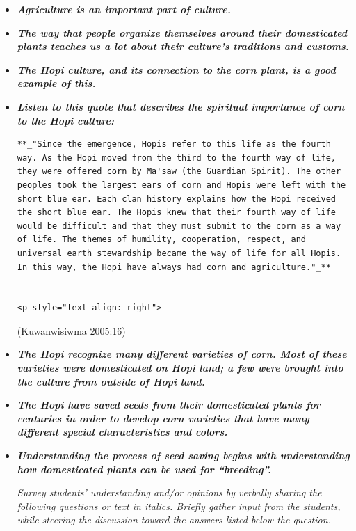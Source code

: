 \documentclass[12pt,]{article}
\begin{document}
\begin{itemize}
\item
  \textbf{\emph{Agriculture is an important part of culture. }}
\item
  \textbf{\emph{The way that people organize themselves around their domesticated plants teaches us a lot about their culture's traditions and customs. }}
\item
  \textbf{\emph{The Hopi culture, and its connection to the corn plant, is a good example of this. }}
\item
  \textbf{\emph{Listen to this quote that describes the spiritual importance of corn to the Hopi culture:}}

\begin{verbatim}
**_"Since the emergence, Hopis refer to this life as the fourth way. As the Hopi moved from the third to the fourth way of life, they were offered corn by Ma'saw (the Guardian Spirit). The other peoples took the largest ears of corn and Hopis were left with the short blue ear. Each clan history explains how the Hopi received the short blue ear. The Hopis knew that their fourth way of life would be difficult and that they must submit to the corn as a way of life. The themes of humility, cooperation, respect, and universal earth stewardship became the way of life for all Hopis. In this way, the Hopi have always had corn and agriculture."_**


<p style="text-align: right">
\end{verbatim}

  (Kuwanwisiwma 2005:16)
\item
  \textbf{\emph{The Hopi recognize many different varieties of corn. Most of these varieties were domesticated on Hopi land; a few were brought into the culture from outside of Hopi land.}}
\item
  \textbf{\emph{The Hopi have saved seeds from their domesticated plants for centuries in order to develop corn varieties that have many different special characteristics and colors. }}
\item
  \textbf{\emph{Understanding the process of seed saving begins with understanding how domesticated plants can be used for ``breeding''.}}

  \emph{Survey students' understanding and/or opinions by verbally sharing the following questions or text in italics. Briefly gather input from the students, while steering the discussion toward the answers listed below the question.}
\end{itemize}
\end{document}
